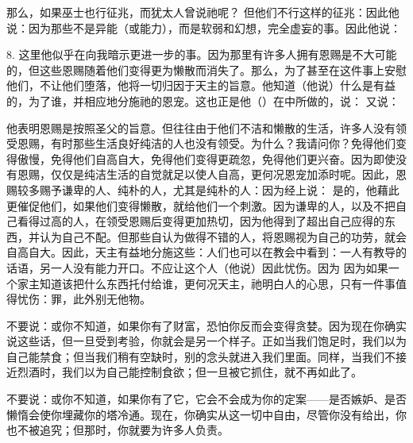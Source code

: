 \par

那么，如果巫士也行征兆，而犹太人曾说祂呢？ 但他们不行这样的征兆：因此他说：因为那些不是异能（或能力），而是软弱和幻想，完全虚妄的事。因此他说：\par

8. 这里他似乎在向我暗示更进一步的事。因为那里有许多人拥有恩赐是不大可能的，但这些恩赐随着他们变得更为懒散而消失了。那么，为了甚至在这件事上安慰他们，不让他们堕落，他将一切归因于天主的旨意。他知道（他说）什么是有益的，为了谁，并相应地分施祂的恩宠。这也正是他（）在中所做的，说： 又说：\par

他表明恩赐是按照圣父的旨意。但往往由于他们不洁和懒散的生活，许多人没有领受恩赐，有时那些生活良好纯洁的人也没有领受。为什么？我请问你？免得他们变得傲慢，免得他们自高自大，免得他们变得更疏忽，免得他们更兴奋。因为即使没有恩赐，仅仅是纯洁生活的自觉就足以使人自高，更何况恩宠加添时呢。因此，恩赐较多赐予谦卑的人、纯朴的人，尤其是纯朴的人：因为经上说： 是的，他藉此更催促他们，如果他们变得懒散，就给他们一个刺激。因为谦卑的人，以及不把自己看得过高的人，在领受恩赐后变得更加热切，因为他得到了超出自己应得的东西，并认为自己不配。但那些自认为做得不错的人，将恩赐视为自己的功劳，就会自高自大。因此，天主有益地分施这些：人们也可以在教会中看到：一人有教导的话语，另一人没有能力开口。不应让这个人（他说）因此忧伤。因为 因为如果一个家主知道该把什么东西托付给谁，更何况天主，祂明白人的心思，只有一件事值得忧伤：罪，此外别无他物。\par

不要说：或你不知道，如果你有了财富，恐怕你反而会变得贪婪。因为现在你确实说这些话，但一旦受到考验，你就会是另一个样子。正如当我们饱足时，我们以为自己能禁食；但当我们稍有空缺时，别的念头就进入我们里面。同样，当我们不接近烈酒时，我们以为自己能控制食欲；但一旦被它抓住，就不再如此了。\par

不要说：或你不知道，如果你有了它，它会不会成为你的定案——是否嫉妒、是否懒惰会使你埋藏你的塔冷通。现在，你确实从这一切中自由，尽管你没有给出，你也不被追究；但那时，你就要为许多人负责。\par


